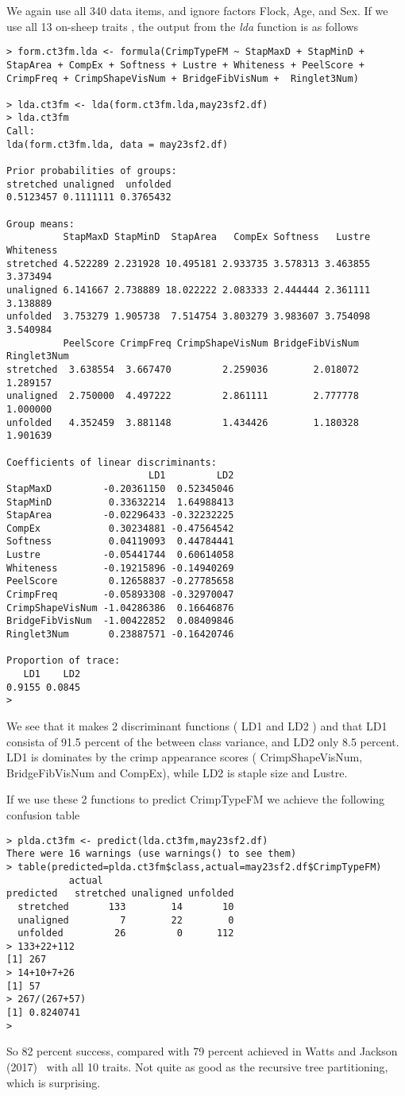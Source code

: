 \documentclass[titlepage]{article}  %
\begin{document}
We again use all 340 data items, and ignore factors Flock, Age, and Sex. If we use all 13 on-sheep traits , the output from the {\em lda} function is as follows
\begin{verbatim}
> form.ct3fm.lda <- formula(CrimpTypeFM ~ StapMaxD + StapMinD + StapArea + CompEx + Softness + Lustre + Whiteness + PeelScore + CrimpFreq + CrimpShapeVisNum + BridgeFibVisNum +  Ringlet3Num)

> lda.ct3fm <- lda(form.ct3fm.lda,may23sf2.df)
> lda.ct3fm
Call:
lda(form.ct3fm.lda, data = may23sf2.df)

Prior probabilities of groups:
stretched unaligned  unfolded 
0.5123457 0.1111111 0.3765432 

Group means:
          StapMaxD StapMinD  StapArea   CompEx Softness   Lustre Whiteness
stretched 4.522289 2.231928 10.495181 2.933735 3.578313 3.463855  3.373494
unaligned 6.141667 2.738889 18.022222 2.083333 2.444444 2.361111  3.138889
unfolded  3.753279 1.905738  7.514754 3.803279 3.983607 3.754098  3.540984
          PeelScore CrimpFreq CrimpShapeVisNum BridgeFibVisNum Ringlet3Num
stretched  3.638554  3.667470         2.259036        2.018072    1.289157
unaligned  2.750000  4.497222         2.861111        2.777778    1.000000
unfolded   4.352459  3.881148         1.434426        1.180328    1.901639

Coefficients of linear discriminants:
                         LD1         LD2
StapMaxD         -0.20361150  0.52345046
StapMinD          0.33632214  1.64988413
StapArea         -0.02296433 -0.32232225
CompEx            0.30234881 -0.47564542
Softness          0.04119093  0.44784441
Lustre           -0.05441744  0.60614058
Whiteness        -0.19215896 -0.14940269
PeelScore         0.12658837 -0.27785658
CrimpFreq        -0.05893308 -0.32970047
CrimpShapeVisNum -1.04286386  0.16646876
BridgeFibVisNum  -1.00422852  0.08409846
Ringlet3Num       0.23887571 -0.16420746

Proportion of trace:
   LD1    LD2 
0.9155 0.0845 
> 
\end{verbatim}
We see that it makes 2 discriminant functions ( LD1 and LD2 ) and that LD1 consista of 91.5 percent of the between class variance, and LD2 only 8.5 percent. LD1 is dominates by the crimp appearance scores ( CrimpShapeVisNum, BridgeFibVisNum and CompEx), while LD2 is staple size and Lustre.

If we use these 2 functions to predict CrimpTypeFM we achieve the following confusion table
\begin{verbatim}
> plda.ct3fm <- predict(lda.ct3fm,may23sf2.df)
There were 16 warnings (use warnings() to see them)
> table(predicted=plda.ct3fm$class,actual=may23sf2.df$CrimpTypeFM)
           actual
predicted   stretched unaligned unfolded
  stretched       133        14       10
  unaligned         7        22        0
  unfolded         26         0      112
> 133+22+112
[1] 267
> 14+10+7+26
[1] 57
> 267/(267+57)
[1] 0.8240741
> 
\end{verbatim}
So 82 percent success, compared with 79 percent achieved in Watts and Jackson (2017)~\cite{watt:17} with all 10 traits. Not quite as good as the recursive tree partitioning, which is surprising.
\end{document}
